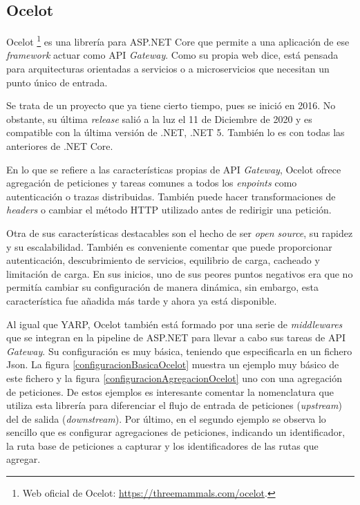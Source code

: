 \documentclass[11pt,spanish,listoffigures]{tfgetsinf}
\begin{document}

		\subsection{Ocelot}

Ocelot \footnote{Web oficial de Ocelot: \url{https://threemammals.com/ocelot}.} es una librería para ASP.NET Core que permite a una aplicación de ese \emph{framework} actuar como API \emph{Gateway}. Como su propia web dice, está pensada para arquitecturas orientadas a servicios o a microservicios que necesitan un punto único de entrada.

Se trata de un proyecto que ya tiene cierto tiempo, pues se inició en 2016. No obstante, su última \emph{release} salió a la luz el 11 de Diciembre de 2020 y es compatible con la última versión de .NET, .NET 5. También lo es con todas las anteriores de .NET Core.

En lo que se refiere a las características propias de API \emph{Gateway}, Ocelot ofrece agregación de peticiones y tareas comunes a todos los \emph{enpoints} como autenticación o trazas distribuidas. También puede hacer transformaciones de \emph{headers} o cambiar el método HTTP utilizado antes de redirigir una petición.

Otra de sus características destacables son el hecho de ser \emph{open source}, su rapidez y su escalabilidad. También es conveniente comentar que puede proporcionar autenticación, descubrimiento de servicios, equilibrio de carga, cacheado y limitación de carga. En sus inicios, uno de sus peores puntos negativos era que no permitía cambiar su configuración de manera dinámica, sin embargo, esta característica fue añadida más tarde y ahora ya está disponible.

Al igual que YARP, Ocelot también está formado por una serie de \emph{middlewares} que se integran en la pipeline de ASP.NET para llevar a cabo sus tareas de API \emph{Gateway}. Su configuración es muy básica, teniendo que especificarla en un fichero Json. La figura \ref{configuracionBasicaOcelot} muestra un ejemplo muy básico de este fichero y la figura \ref{configuracionAgregacionOcelot} uno con una agregación de peticiones. De estos ejemplos es interesante comentar la nomenclatura que utiliza esta librería para diferenciar el flujo de entrada de peticiones (\emph{upstream}) del de salida (\emph{downstream}). Por último, en el segundo ejemplo se observa lo sencillo que es configurar agregaciones de peticiones, indicando un identificador, la ruta base de peticiones a capturar y los identificadores de las rutas que agregar.
\end{document}
